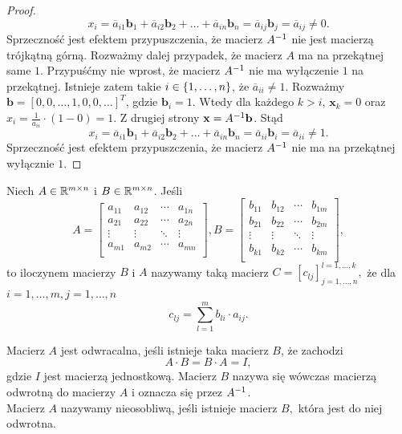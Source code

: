 \documentclass[12pt,a4paper]{report}
\newcommand{\vr}[1]{\mathbf{#1}}
\newcommand{\mx}[1]{{#1}}
\begin{document}
\begin{proof}
$$
x_{i} = \overline{a}_{i1} \vr{b}_{1} + \overline{a}_{i2} \vr{b}_{2} + \ldots + \overline{a}_{in} \vr{b}_{n} = \overline{a}_{ij} \vr{b}_{j} = \overline{a}_{ij} \neq 0.
$$ 
Sprzeczność jest efektem przypuszczenia, że macierz $\inverse{\mx{A}}$ nie jest macierzą trójkątną górną.
Rozważmy dalej przypadek, że macierz $\mx{A}$ ma na przekątnej same $1$. Przypuśćmy nie wprost, że macierz $\inverse{\mx{A}}$ nie ma wyłączenie $1$ na przekątnej. Istnieje zatem takie $ i \in \left\lbrace {1, \ldots, n} \right\rbrace$, że $\overline{a}_{ii} \neq 1$. Rozważmy $\vr{b} = [0,0, \ldots, 1,0,0, \ldots]^{T}$, gdzie $\vr{b}_{i} = 1$. Wtedy dla każdego $k>i$, $\vr{x}_{k} = 0$ oraz $x_{i} = \frac{1}{a_{ii}} \cdot(1 - 0 ) = 1$. Z drugiej strony $\vr{x} = \inverse{\mx{A}} \vr{b}$. Stąd 
$$
x_{i} = \overline{a}_{i1} \vr{b}_{1} + \overline{a}_{i2} \vr{b}_{2} + \ldots + \overline{a}_{in} \vr{b}_{n} = \overline{a}_{ii} \vr{b}_{i} = \overline{a}_{ii} \neq 1.
$$
Sprzeczność jest efektem przypuszczenia, że macierz $\inverse{\mx{A}}$ nie ma na przekątnej wyłącznie $1$.

\end{proof}


\begin{definition}
Niech $\mx{A}\in \setR^{m \times n }$ i $\mx{B}\in \setR^{m \times n }$. Jeśli
$$
\mx{A} = \begin{bmatrix}
 a_{11} & a_{12} & \cdots & a_{1n} \\
         a_{21} & a_{22} & \cdots & a_{2n} \\
         \vdots & \vdots & \ddots & \vdots \\
         a_{m1} & a_{m2} & \cdots & a_{mn} \\
\end{bmatrix}, \mx{B} = \begin{bmatrix}
 b_{11} & b_{12} & \cdots & b_{1m} \\
         b_{21} & b_{22} & \cdots & b_{2m} \\
         \vdots & \vdots & \ddots & \vdots \\
         b_{k1} & b_{k2} & \cdots & b_{km} \\
\end{bmatrix},
$$ 
to iloczynem macierzy $\mx{B}$ i $\mx{A}$ nazywamy taką macierz $\mx{C} = [c_{lj}]_{j=1,\ldots,n}^{l=1,\ldots,k},$ że dla $i=1,\ldots,m, j=1,\ldots,n $
$$
c_{lj}= \sum_{l=1}^{m} b_{li} \cdot a_{ij}.
$$
\end{definition}


\begin{definition} 
Macierz $\mx{A}$ jest odwracalna, jeśli istnieje taka macierz $\mx{B}$, że zachodzi
$$
\mx{A}\cdot \mx{B}=\mx{B}\cdot \mx{A}=\mx{I},
$$ 
gdzie $\mx{I}$ jest macierzą jednostkową. Macierz $\mx{B}$ nazywa się wówczas macierzą odwrotną do macierzy $\mx{A}$ i oznacza się przez  $\inverse{\mx{A}}$. \\
Macierz $\mx{A}$ nazywamy nieosobliwą, jeśli istnieje macierz $\mx{B},$ która jest do niej odwrotna.

\end{definition}
\end{document}
